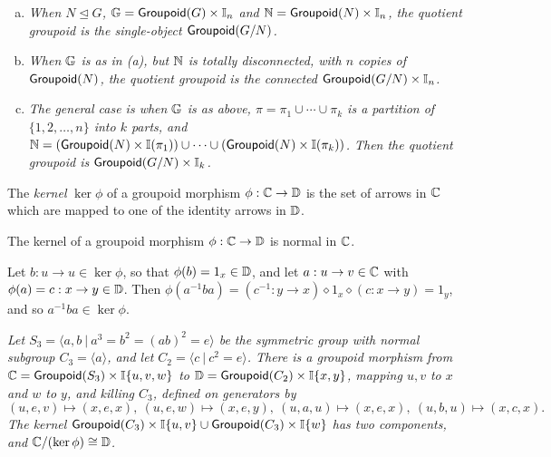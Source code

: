 \begin{figure}[htbp]
\begin{center}

\label{figure:gpd-equiv}
\end{center}
\end{figure}

\medskip
\begin{example}
\begin{enumerate}[(a)]
\item
\emph{When $N \unlhd G$, $\mathbb{G} = {\sf Groupoid}(G)\times\mathbb{I}_n$ and 
$\mathbb{N} = {\sf Groupoid}(N)\times\mathbb{I}_n$, the quotient groupoid is 
the single-object ${\sf Groupoid}(G/N)$.} 
\item
\emph{When $\mathbb{G}$ is as in (a), but $\mathbb{N}$ is totally disconnected, 
with $n$ copies of ${\sf Groupoid}(N)$, the quotient groupoid is the 
connected ${\sf Groupoid}(G/N)\times\mathbb{I}_n$.} 
\item
\emph{The general case is when $\mathbb{G}$ is as above, 
$\pi = \pi_1 \cup \cdots \cup \pi_k$ is a partition of $\{1,2,\ldots,n\}$ 
into $k$ parts, and 
$\mathbb{N} = ({\sf Groupoid}(N)\times\mathbb{I}(\pi_1))\cup\cdots\cup({\sf Groupoid}(N)\times\mathbb{I}(\pi_k))$.  
Then the quotient groupoid is ${\sf Groupoid}(G/N)\times\mathbb{I}_k$.} 
\end{enumerate}
\end{example}


\medskip {} 
The \emph{kernel} $\ker\phi$ of a groupoid morphism $\phi : \mathbb{C} \to \mathbb{D}$ 
is the set of arrows in $\mathbb{C}$ which are mapped to 
one of the identity arrows in $\mathbb{D}$. 

\begin{lem}
The kernel of a groupoid morphism $\phi : \mathbb{C} \to \mathbb{D}$ is normal in $\mathbb{C}$. 
\end{lem} 
\begin{pf} 
Let $b : u \to u \in \ker\phi$, so that $\phi(b) = 1_x \in \mathbb{D}$, 
and let $a : u \to v \in \mathbb{C}$ with $\phi(a) = c : x \to y \in \mathbb{D}$. 
Then $\phi(a^{-1}ba) = (c^{-1} : y \to x) \diamond 1_x \diamond (c : x \to y) = 1_y$, 
and so $a^{-1}ba \in \ker\phi$. 
\end{pf} 

\begin{example}
\emph{Let $S_3 = \langle a,b ~|~ a^3=b^2=(ab)^2=e \rangle$ 
be the symmetric group with normal subgroup $C_3 = \langle a \rangle$, 
and let $C_2 = \langle c ~|~ c^2=e \rangle$. 
There is a groupoid morphism from $\mathbb{C} = {\sf Groupoid}(S_3)\times\mathbb{I}\{u,v,w\}$ 
to $\mathbb{D} = {\sf Groupoid}(C_2)\times\mathbb{I}\{x,y\}$, 
mapping $u,v$ to $x$ and $w$ to $y$, and killing $C_3$, 
defined on generators by 
$$
(u,e,v)\mapsto(x,e,x), ~
(u,e,w)\mapsto(x,e,y), ~
(u,a,u)\mapsto(x,e,x), ~ 
(u,b,u)\mapsto(x,c,x).
$$
The kernel ${\sf Groupoid}(C_3)\times\mathbb{I}\{u,v\} \cup {\sf Groupoid}(C_3)\times\mathbb{I}\{w\}$ 
has two components, and $\mathbb{C}/(\ker\phi)\cong\mathbb{D}$. 
}\end{example}

